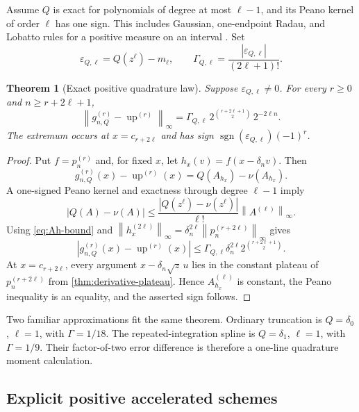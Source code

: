 \documentclass[11pt]{article}
\newtheorem{theorem}{Theorem}[section]
\theoremstyle{definition}
\theoremstyle{remark}
\newcommand{\Up}{\operatorname{up}}
\newcommand{\norm}[1]{\left\lVert #1\right\rVert}
\begin{document}
Assume $Q$ is exact for polynomials of degree at most $\ell-1$, and its Peano kernel
of order $\ell$ has one sign.  This includes Gaussian, one-endpoint Radau, and
Lobatto rules for a positive measure on an interval \cite{davis-rabinowitz,gautschi}.
Set
\begin{equation}
 \varepsilon_{Q,\ell}=Q(z^\ell)-m_\ell,
 \qquad
 \Gamma_{Q,\ell}=\frac{|\varepsilon_{Q,\ell}|}{(2\ell+1)!}.
 \label{eq:gammaQ}
\end{equation}

\begin{theorem}[Exact positive quadrature law]
\label{thm:quadrature-law}
Suppose $\varepsilon_{Q,\ell}\ne0$.  For every $r\ge0$ and
$n\ge r+2\ell+1$,
\begin{equation}
 \boxed{
 \norm{g_{n,Q}^{(r)}-\Up^{(r)}}_\infty
 =\Gamma_{Q,\ell}\,
 2^{\binom{r+2\ell+1}{2}}\,2^{-2\ell n}.}
 \label{eq:quadrature-law}
\end{equation}
The extremum occurs at $x=c_{r+2\ell}$ and has sign
$\operatorname{sgn}(\varepsilon_{Q,\ell})(-1)^r$.
\end{theorem}

\begin{proof}
Put $f=p_n^{(r)}$ and, for fixed $x$, let
$h_x(v)=f(x-\delta_nv)$.  Then
\[
 g_{n,Q}^{(r)}(x)-\Up^{(r)}(x)
 =Q(A_{h_x})-\nu(A_{h_x}).
\]
A one-signed Peano kernel and exactness through degree $\ell-1$ imply
\[
 |Q(A)-\nu(A)|
 \le\frac{|Q(z^\ell)-\nu(z^\ell)|}{\ell!}\norm{A^{(\ell)}}_\infty.
\]
Using \cref{eq:Ah-bound} and
$\norm{h_x^{(2\ell)}}_\infty
 =\delta_n^{2\ell}\norm{p_n^{(r+2\ell)}}_\infty$ gives
\[
 |g_{n,Q}^{(r)}(x)-\Up^{(r)}(x)|
 \le\Gamma_{Q,\ell}\delta_n^{2\ell}
 2^{\binom{r+2\ell+1}{2}}.
\]
At $x=c_{r+2\ell}$, every argument
$x-\delta_n\sqrt z\,u$ lies in the constant plateau of
$p_n^{(r+2\ell)}$ from \cref{thm:derivative-plateau}.  Hence
$A_{h_x}^{(\ell)}$ is constant, the Peano inequality is an equality, and the asserted
sign follows.
\end{proof}

Two familiar approximations fit the same theorem.  Ordinary truncation is
$Q=\delta_0$, $\ell=1$, with $\Gamma=1/18$.  The repeated-integration spline is
$Q=\delta_1$, $\ell=1$, with $\Gamma=1/9$.  Their factor-of-two error difference is
therefore a one-line quadrature moment calculation.

\subsection{Explicit positive accelerated schemes}
\end{document}
